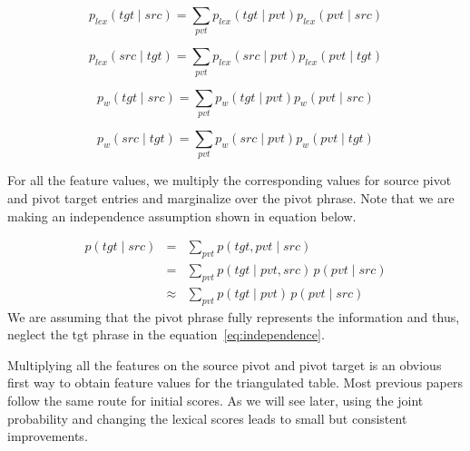  		\begin{equation} \label{eq:first}
                 p_{lex}(tgt \mid src) = \sum_{pvt} p_{lex}(tgt \mid pvt) p_{lex}(pvt \mid src)
        \end{equation}

        \begin{equation}
        	p_{lex}(src \mid tgt) = \sum_{pvt} p_{lex}(src \mid pvt) p_{lex}(pvt \mid tgt)
        \end{equation}

         \begin{equation}
        	p_w(tgt \mid src) = \sum_{pvt} p_w(tgt \mid pvt) p_w(pvt \mid src)
        \end{equation}

        \begin{equation} \label{eq:last}
        	p_w(src \mid tgt) = \sum_{pvt} p_w(src \mid pvt) p_w(pvt \mid tgt)
        \end{equation}

        For all the feature values, we multiply the corresponding values for source pivot and pivot target entries and marginalize over the pivot phrase. Note that we are making an independence assumption shown in equation below. 

         \begin{eqnarray*} \label{eq:independence}
                p(tgt \mid src)&=&\sum_{pvt}{p(tgt, pvt \mid src)}\\
                &=& \sum_{pvt}{p(tgt \mid pvt, src)\,p(pvt \mid src)}\\
                &\approx& \sum_{pvt}{p(tgt \mid pvt)\,p(pvt \mid src)}
        \end{eqnarray*}
        We are assuming that the pivot phrase fully represents the information and thus, neglect the tgt phrase in the equation~\eqref{eq:independence}.


        Multiplying all the features on the source pivot and pivot target is an obvious first way to obtain feature values for the triangulated table. Most previous papers follow the same route for initial scores. As we will see later, using the joint probability and changing the lexical scores leads to small but consistent improvements. 



\newcommand{\maninexample}[1]{\emph{$\grave{a}$ $l\acute{a}$ $b\acute{a}\acute{a}r\acute{a}$ \textipa{\textltailn}$\acute{u}m\acute{a}$ $k\acute{o}s\acute{ɔ}n$}}

